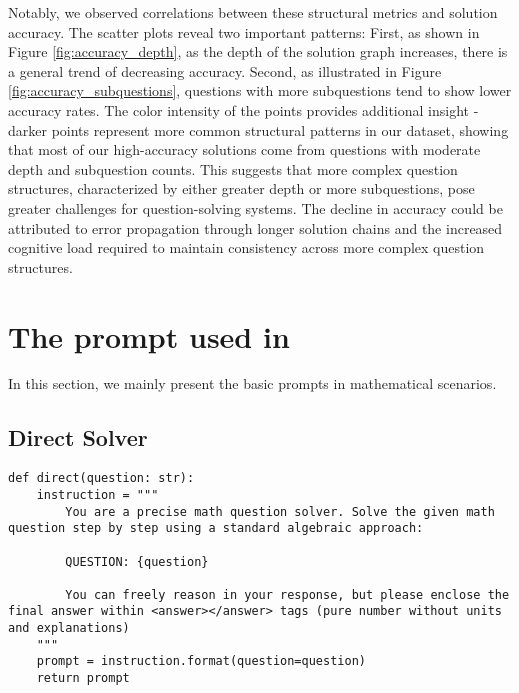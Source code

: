 Notably, we observed correlations between these structural metrics and solution accuracy. The scatter plots reveal two important patterns: First, as shown in Figure \ref{fig:accuracy_depth}, as the depth of the solution graph increases, there is a general trend of decreasing accuracy. Second, as illustrated in Figure \ref{fig:accuracy_subquestions}, questions with more subquestions tend to show lower accuracy rates. The color intensity of the points provides additional insight - darker points represent more common structural patterns in our dataset, showing that most of our high-accuracy solutions come from questions with moderate depth and subquestion counts. This suggests that more complex question structures, characterized by either greater depth or more subquestions, pose greater challenges for question-solving systems. The decline in accuracy could be attributed to error propagation through longer solution chains and the increased cognitive load required to maintain consistency across more complex question structures.

\section{The prompt used in \our}
In this section, we mainly present the basic prompts in mathematical scenarios.

\subsection{Direct Solver}
\begin{lstlisting}[style=PythonStyle, caption={Direct Solver Prompt Template}]
def direct(question: str):
    instruction = """
        You are a precise math question solver. Solve the given math question step by step using a standard algebraic approach:

        QUESTION: {question}
        
        You can freely reason in your response, but please enclose the final answer within <answer></answer> tags (pure number without units and explanations)
    """
    prompt = instruction.format(question=question)
    return prompt
\end{lstlisting}
